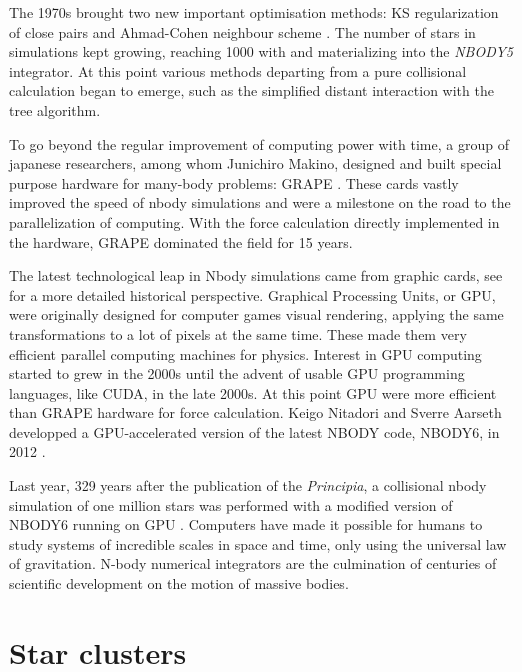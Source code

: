The 1970s brought two new important optimisation methods: KS regularization of close pairs \citep{Aarseth1972} and Ahmad-Cohen neighbour scheme \citep{AhmadCohen1973}. The number of stars in simulations kept growing, reaching 1000 with \cite{Terlevich1980} and materializing into the \textit{NBODY5} integrator. At this point various methods departing from a pure collisional calculation began to emerge, such as the simplified distant interaction with the \cite{BarnesHut1986} tree algorithm.

To go beyond the regular improvement of computing power with time, a group of japanese researchers, among whom Junichiro Makino, designed and built special purpose hardware for many-body problems: GRAPE \citep{Ebisuzaki1990,Ito1991}. These cards vastly improved the speed of nbody simulations and were a milestone on the road to the parallelization of computing. With the force calculation directly implemented in the hardware, GRAPE dominated the field for 15 years.

The latest technological leap in Nbody simulations came from graphic cards, see \cite{Bedorf2012} for a more detailed historical perspective. Graphical Processing Units, or GPU, were originally designed for computer games visual rendering, applying the same transformations to a lot of pixels at the same time. These made them very efficient parallel computing machines for physics. Interest in GPU computing started to grew in the 2000s \citep{Nyland2004,Elsen2006,SPZ2007} until the advent of usable GPU programming languages, like CUDA, in the late 2000s. At this point GPU were more efficient than GRAPE hardware for force calculation. Keigo Nitadori and Sverre Aarseth developped a GPU-accelerated version of the latest NBODY code, NBODY6, in 2012 \citep{Nitadori2012}.

Last year, 329 years after the publication of the \textit{Principia}, a collisional nbody simulation of one million stars was performed with a modified version of NBODY6 running on GPU \citep{Wang2015}. Computers have made it possible for humans to study systems of incredible scales in space and time, only using the universal law of gravitation. N-body numerical integrators are the culmination of centuries of scientific development on the motion of massive bodies.



\newpage
\section{Star clusters}




